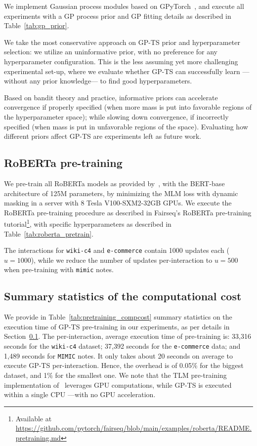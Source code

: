 We implement Gaussian process modules based on GPyTorch~\citep{gpytorch},
and execute all experiments with a GP process prior and GP fitting details as described in Table~\ref{tab:gp_prior}.


We take the most conservative approach on GP-TS prior and hyperparameter selection:
we utilize an uninformative prior, with no preference for any hyperparameter configuration.
This is the less assuming yet more challenging experimental set-up,
where we evaluate whether GP-TS can successfully learn ---without any prior knowledge--- to find good hyperparameters.

Based on bandit theory and practice,
informative priors can accelerate convergence if properly specified
(\ie when more mass is put into favorable regions of the hyperparameter space);
while slowing down convergence, if incorrectly specified
(\ie when mass is put in unfavorable regions of the space).
Evaluating how different priors affect GP-TS are experiments left as future work.

\clearpage
\subsection{RoBERTa pre-training}
\label{asec:implementation_details_roberta_pretrain}

We pre-train all RoBERTa models as provided by~\citet{fairseq},
with the BERT-base architecture of 125M parameters, by minimizing the MLM loss with dynamic masking
in a server with 8 Tesla V100-SXM2-32GB GPUs.
%
We execute the RoBERTa pre-training procedure as described in Fairseq's RoBERTa pre-training tutorial\footnote{
	Available at \url{https://github.com/pytorch/fairseq/blob/main/examples/roberta/README.pretraining.md}
},
with specific hyperparameters as described in Table~\ref{tab:roberta_pretrain}.

The interactions for \texttt{wiki-c4} and \texttt{e-commerce} contain 1000 updates each (\ie $u=1000$), while we reduce the number of updates per-interaction to $u=500$ when pre-training with \texttt{mimic} notes.



\clearpage
\subsection{Summary statistics of the computational cost}
\label{asec:computational_overhead}

We provide in Table~\ref{tab:pretraining_compcost} summary statistics
on the execution time of GP-TS pre-training in our experiments,
as per details in Section~\ref{asec:implementation_details_roberta_pretrain}.
The per-interaction, average execution time of pre-training is:
33,316 seconds for the \texttt{wiki-c4} dataset;
37,392 seconds for the \texttt{e-commerce} data;
and 1,489 seconds for \texttt{MIMIC} notes.
It only takes about 20 seconds on average to execute GP-TS per-interaction.
Hence, the overhead is of 0.05\% for the biggest dataset, and 1\% for the smallest one.
We note that the TLM pre-training implementation of~\citet{fairseq} leverages GPU computations,
while GP-TS is executed within a single CPU ---with no GPU acceleration.

